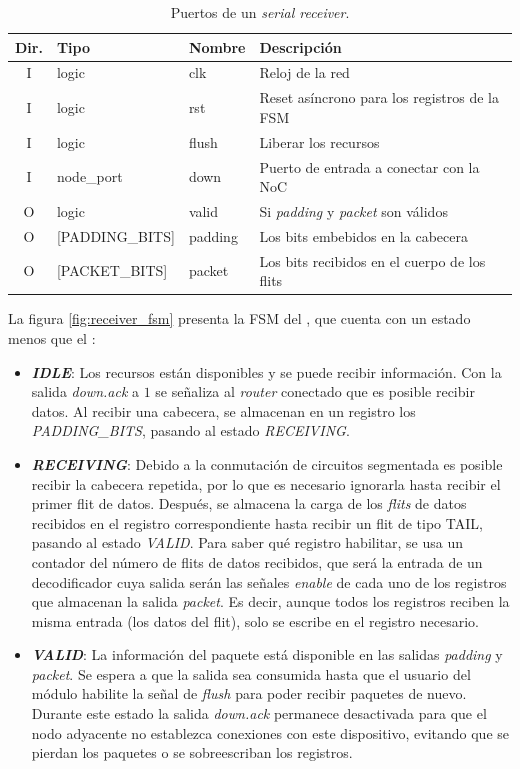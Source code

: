 \begin{table}[h]
    \centering
    \footnotesize
    \begin{tabular}{c|l|l|l}
        \hline
        \textbf{Dir.} & \textbf{Tipo} & \textbf{Nombre} & \textbf{Descripción} \\\hline
        I & logic & clk   & Reloj de la red \\
        I & logic & rst   & Reset asíncrono para los registros de la FSM \\
        I & logic & flush & Liberar los recursos \\
        I & node\_port & down & Puerto de entrada a conectar con la NoC \\
        O & logic & valid & Si \textit{padding} y \textit{packet} son válidos \\
        O & [PADDING\_BITS] & padding & Los bits embebidos en la cabecera \\
        O & [PACKET\_BITS] & packet & Los bits recibidos en el cuerpo de los flits \\\hline
    \end{tabular}
    \caption{Puertos de un \textit{serial receiver}.}
    \label{tab:receiver_ports}
\end{table}

La figura \ref{fig:receiver_fsm} presenta la FSM del , que cuenta con un estado menos que el :
\begin{itemize}
    \item \textbf{\textit{IDLE}}: Los recursos están disponibles y se puede recibir información. Con la salida \textit{down.ack} a $1$ se señaliza al \textit{router} conectado que es posible recibir datos. Al recibir una cabecera, se almacenan en un registro los \textit{PADDING\_BITS}, pasando al estado \textit{RECEIVING}.
    \item \textbf{\textit{RECEIVING}}: Debido a la conmutación de circuitos segmentada es posible recibir la cabecera repetida, por lo que es necesario ignorarla hasta recibir el primer flit de datos. Después, se almacena la carga de los \textit{flits} de datos recibidos en el registro correspondiente hasta recibir un flit de tipo TAIL, pasando al estado \textit{VALID}. Para saber qué registro habilitar, se usa un contador del número de flits de datos recibidos, que será la entrada de un decodificador cuya salida serán las señales \textit{enable} de cada uno de los registros que almacenan la salida \textit{packet}. Es decir, aunque todos los registros reciben la misma entrada (los datos del flit), solo se escribe en el registro necesario.
    \item \textbf{\textit{VALID}}: La información del paquete está disponible en las salidas \textit{padding} y \textit{packet}. Se espera a que la salida sea consumida hasta que el usuario del módulo habilite la señal de \textit{flush} para poder recibir paquetes de nuevo. Durante este estado la salida \textit{down.ack} permanece desactivada para que el nodo adyacente no establezca conexiones con este dispositivo, evitando que se pierdan los paquetes o se sobreescriban los registros.
\end{itemize}

